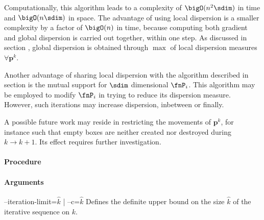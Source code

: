 Computationally, this algorithm leads to a complexity of $\bigO(n^2 \sdim)$ in time and $\bigO(n \sdim)$ in space. The advantage of using local dispersion is a smaller complexity by a factor of $\bigO(n)$ in time, because computing both gradient and global dispersion is carried out together, within one step. As discussed in section , global dispersion is obtained through $\max$ of local dispersion measures $\forall \bm p^k$.

Another advantage of sharing local dispersion with the algorithm described in section  is the mutual support for $\sdim$ dimensional $\fnP_i$. This algorithm may be employed to modify $\fnP_i$ in trying to reduce its dispersion measure. However, such iterations may increase dispersion, inbetween or finally.

A possible future work may reside in restricting the movements of $\bm p^k$, for instance such that empty boxes are neither created nor destroyed during $k \rightarrow k+1$. Its effect requires further investigation.

\paragraph{Procedure}

\begin{synopsis}
\end{synopsis}

\paragraph{Arguments}

\procarginseq{\ptseqsize}

\procargout

\begin{procarg}{--iteration-limit=$\widehat k$ | --c=$\widehat k$}
  Defines the definite upper bound on the size $\widehat k$ of the iterative sequence on $k$.
\end{procarg}

